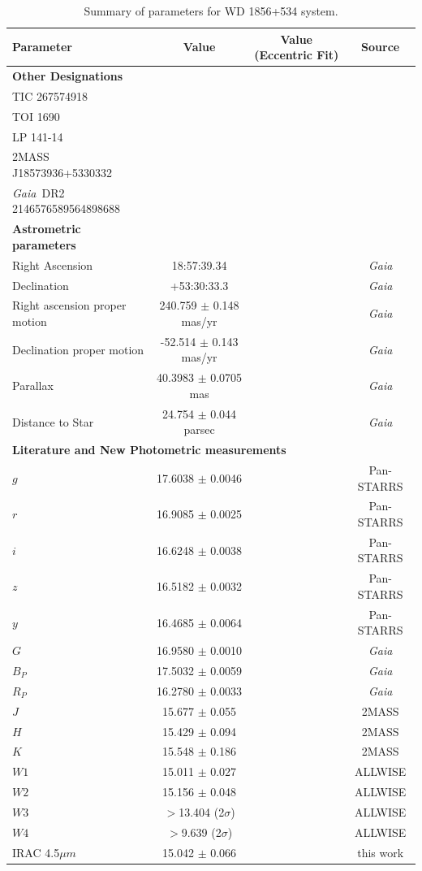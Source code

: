 \documentclass{nature3}
\newcommand*{\bedit}{\textcolor{new_black}}
\newcommand{\project}[1]{\textsl{#1}}
\newcommand{\Gaia}{\project{Gaia}}
\begin{document}
\begin{table}
\begin{threeparttable}
\scriptsize
\centering
\caption{Summary of parameters for WD 1856+534 system.} \label{parameters}
\medskip
\begin{tabular}{lccc}
\hline
Parameter & Value & Value (Eccentric Fit) & Source \\
\hline
\textbf{Other Designations} & & &  \\
TIC 267574918& &  & \\
TOI 1690& &  & \\
LP 141-14 & &  & \\
2MASS J18573936+5330332 & &  & \\
\Gaia\ DR2 2146576589564898688 & &  & \\
\textbf{Astrometric parameters} & & &  \\
Right Ascension & 18:57:39.34&  & \Gaia\\
Declination & +53:30:33.3 &  & \Gaia\\
Right ascension proper motion & 240.759 $\pm$ 0.148 mas/yr & & \Gaia\\
Declination proper motion & -52.514 $\pm$ 0.143 mas/yr & & \Gaia\\
Parallax & 40.3983 $\pm$ 0.0705 mas & & \Gaia\\
Distance to Star & 24.754 $\pm$ 0.044 parsec & & \Gaia\\

\multicolumn{4}{l}{\textbf{Literature and New Photometric measurements}} \\
$g$ & 17.6038  $\pm$  0.0046 & & Pan-STARRS\\
$r$ & 16.9085  $\pm$  0.0025 & & Pan-STARRS\\
$i$ & 16.6248  $\pm$  0.0038 & & Pan-STARRS\\
$z$ & 16.5182  $\pm$  0.0032 & & Pan-STARRS\\
$y$ & 16.4685  $\pm$  0.0064 & & Pan-STARRS\\
$G$ & 16.9580  $\pm$  0.0010 & & \Gaia\\
$B_P$ & 17.5032 $\pm$  0.0059 & & \Gaia\\
$R_P$ & 16.2780  $\pm$  0.0033 & & \Gaia\\

$J$ & 15.677  $\pm$  0.055 & & 2MASS\\
$H$ & 15.429 $\pm$ 0.094 & & 2MASS\\
$K$ & 15.548 $\pm$ 0.186 & & 2MASS\\
$W1$ & 15.011 $\pm$ 0.027 & & ALLWISE\\
$W2$ & 15.156 $\pm$ 0.048 & & ALLWISE\\
$W3$ & $>$13.404 (2$\sigma$) & & ALLWISE\\
$W4$ & $>$9.639 (2$\sigma$) & & ALLWISE\\
\bedit{IRAC 4.5$\mu m$} & \bedit{15.042 $\pm$ 0.066} & & \bedit{this work}\\


\end{tabular}
\end{threeparttable}
\end{table}
\end{document}
